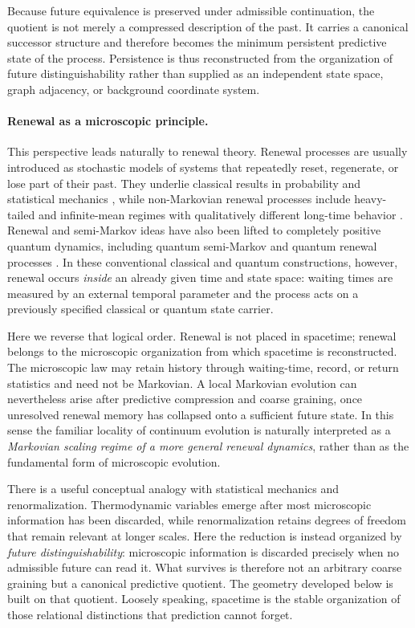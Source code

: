 \documentclass[11pt]{article}
\numberwithin{equation}{section}
\theoremstyle{definition}
\theoremstyle{remark}
\begin{document}
Because future equivalence is preserved under admissible continuation, the
quotient is not merely a compressed description of the past.  It carries a
canonical successor structure and therefore becomes the minimum persistent
predictive state of the process.  Persistence is thus reconstructed from the
organization of future distinguishability rather than supplied as an
independent state space, graph adjacency, or background coordinate system.

\paragraph{Renewal as a microscopic principle.}
This perspective leads naturally to renewal theory.  Renewal processes are
usually introduced as stochastic models of systems that repeatedly reset,
regenerate, or lose part of their past.  They underlie classical results in
probability and statistical mechanics \cite{feller}, while non-Markovian
renewal processes include heavy-tailed and infinite-mean regimes with
qualitatively different long-time behavior
\cite{garsialamperti1962,erickson1970,caravennadoney2019}.  Renewal and
semi-Markov ideas have also been lifted to completely positive quantum
dynamics, including quantum semi-Markov and quantum renewal processes
\cite{BreuerVacchini2008,Vacchini2020}.  In these conventional classical and
quantum constructions, however, renewal occurs \emph{inside} an already given
time and state space: waiting times are measured by an external temporal
parameter and the process acts on a previously specified classical or quantum
state carrier.

Here we reverse that logical order.  Renewal is not placed in spacetime;
renewal belongs to the microscopic organization from which spacetime is
reconstructed.  The microscopic law may retain history through waiting-time,
record, or return statistics and need not be Markovian.  A local Markovian
evolution can nevertheless arise after predictive compression and coarse
graining, once unresolved renewal memory has collapsed onto a sufficient
future state.  In this sense the familiar locality of continuum evolution is
naturally interpreted as a \emph{Markovian scaling regime of a more general
renewal dynamics}, rather than as the fundamental form of microscopic
evolution.

There is a useful conceptual analogy with statistical mechanics and
renormalization.  Thermodynamic variables emerge after most microscopic
information has been discarded, while renormalization retains degrees of
freedom that remain relevant at longer scales.  Here the reduction is instead
organized by \emph{future distinguishability}: microscopic information is
discarded precisely when no admissible future can read it.  What survives is
therefore not an arbitrary coarse graining but a canonical predictive quotient.
The geometry developed below is built on that quotient.  Loosely speaking,
spacetime is the stable organization of those relational distinctions that
prediction cannot forget.
\end{document}
